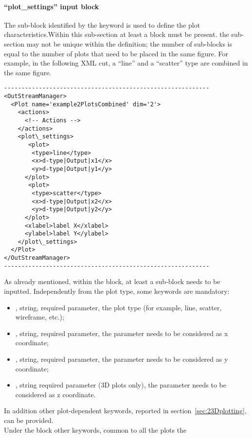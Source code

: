 \paragraph{``plot\_settings'' input block \label{sec:plotSettings}}
The sub-block identified by the keyword  is used to define the
plot characteristics.Within this sub-section at least a  block must be
present.
%
the  sub-section may not be unique within the 
definition; the number of  sub-blocks is equal to the number of plots
that need to be placed in the same figure.
%
For example, in the following XML cut, a ``line'' and a ``scatter'' type are
combined in the same figure.
%
\begin{lstlisting}[style=XML]
-----------------------------------------------------------
<OutStreamManager>
  <Plot name='example2PlotsCombined' dim='2'>
    <actions>
      <!-- Actions -->
    </actions>
    <plot\_settings>
       <plot>
        <type>line</type>
        <x>d-type|Output|x1</x>
        <y>d-type|Output|y1</y>
      </plot>
       <plot>
        <type>scatter</type>
        <x>d-type|Output|x2</x>
        <y>d-type|Output|y2</y>
      </plot>
      <xlabel>label X</xlabel>
      <ylabel>label Y</ylabel>
    </plot\_settings>
  </Plot>
</OutStreamManager>
-----------------------------------------------------------
\end{lstlisting}
As already mentioned, within the  block, at least a 
sub-block needs to be inputted.
%
Independently from the plot type, some keywords are mandatory:
\begin{itemize}
  \item \textit{}, string, required parameter, the plot type (for
  example, line, scatter, wireframe, etc.);
  \item \textit{}, string, required parameter, the parameter needs to be
  considered as x coordinate;
  \item \textit{}, string, required parameter, the parameter needs to be
  considered as y coordinate;
  \item \textit{}, string required parameter (3D plots only), the parameter
  needs to be considered as z coordinate.
\end{itemize}
In addition other plot-dependent keywords, reported in
section~\ref{sec:23Dplotting}, can be provided.
%
\\Under the  block other keywords, common to all the plots the
